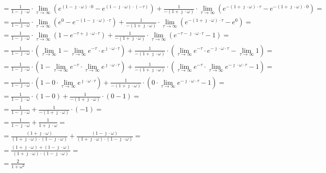 \begin{task}
\begin{align*}
&=\frac{1}{1-\jmath \cdot \omega }\cdot \lim_{\tau \rightarrow \infty} \left( e^{\left(1-\jmath \cdot \omega \right)\cdot 0} - e^{\left(1-\jmath \cdot \omega \right)\cdot (-\tau)}\right) + \frac{1}{-\left(1+\jmath \cdot \omega\right)}\cdot \lim_{\tau \rightarrow \infty} \left( e^{-\left(1+\jmath \cdot \omega \right)\cdot \tau} - e^{-\left(1+\jmath \cdot \omega \right)\cdot 0}\right)=\\
&=\frac{1}{1-\jmath \cdot \omega }\cdot \lim_{\tau \rightarrow \infty} \left( e^{0} - e^{-\left(1-\jmath \cdot \omega \right)\cdot \tau}\right) + \frac{1}{-\left(1+\jmath \cdot \omega\right)}\cdot \lim_{\tau \rightarrow \infty} \left( e^{-\left(1+\jmath \cdot \omega \right)\cdot \tau} - e^{0}\right)=\\
&=\frac{1}{1-\jmath \cdot \omega }\cdot \lim_{\tau \rightarrow \infty} \left( 1 - e^{-\tau +\jmath \cdot \omega \cdot \tau}\right) + \frac{1}{-\left(1+\jmath \cdot \omega\right)}\cdot \lim_{\tau \rightarrow \infty} \left( e^{-\tau -\jmath \cdot \omega \cdot \tau} - 1\right)=\\
&=\frac{1}{1-\jmath \cdot \omega }\cdot \left( \lim_{\tau \rightarrow \infty} 1 - \lim_{\tau \rightarrow \infty} e^{-\tau} \cdot e^{\jmath \cdot \omega \cdot \tau}\right) + \frac{1}{-\left(1+\jmath \cdot \omega\right)}\cdot \left(\lim_{\tau \rightarrow \infty} e^{-\tau}\cdot e^{-\jmath \cdot \omega \cdot \tau} - \lim_{\tau \rightarrow \infty} 1\right)=\\
&=\frac{1}{1-\jmath \cdot \omega }\cdot \left( 1 - \lim_{\tau \rightarrow \infty} e^{-\tau} \cdot \lim_{\tau \rightarrow \infty} e^{\jmath \cdot \omega \cdot \tau}\right) + \frac{1}{-\left(1+\jmath \cdot \omega\right)}\cdot \left(\lim_{\tau \rightarrow \infty} e^{-\tau}\cdot \lim_{\tau \rightarrow \infty} e^{-\jmath \cdot \omega \cdot \tau} - 1\right)=\\
&=\frac{1}{1-\jmath \cdot \omega }\cdot \left( 1 - 0 \cdot \lim_{\tau \rightarrow \infty} e^{\jmath \cdot \omega \cdot \tau}\right) + \frac{1}{-\left(1+\jmath \cdot \omega\right)}\cdot \left(0\cdot \lim_{\tau \rightarrow \infty} e^{-\jmath \cdot \omega \cdot \tau} - 1\right)=\\
&=\frac{1}{1-\jmath \cdot \omega }\cdot \left( 1 - 0 \right) + \frac{1}{-\left(1+\jmath \cdot \omega\right)}\cdot \left(0 - 1\right)=\\
&=\frac{1}{1-\jmath \cdot \omega } + \frac{1}{-\left(1+\jmath \cdot \omega\right)} \cdot (-1)=\\
&=\frac{1}{1-\jmath \cdot \omega } + \frac{1}{1+\jmath \cdot \omega}=\\
&=\frac{\left(1+\jmath \cdot \omega\right)}{\left(1+\jmath \cdot \omega\right) \cdot \left(1-\jmath \cdot \omega\right) } + \frac{\left(1-\jmath \cdot \omega\right)}{\left(1+\jmath \cdot \omega\right)\cdot \left(1-\jmath \cdot \omega\right)}=\\
&=\frac{\left(1+\jmath \cdot \omega\right) + \left(1-\jmath \cdot \omega\right)}{\left(1+\jmath \cdot \omega\right) \cdot \left(1-\jmath \cdot \omega\right) }=\\
&=\frac{2}{1+\omega^2}
\end{align*}


\end{task}
